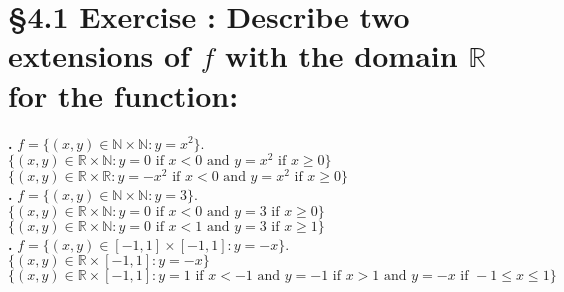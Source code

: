 \documentclass[a4paper,11pt]{article}
\begin{document}
\section*{\S 4.1 Exercise : Describe two extensions of \(f\) with the domain \(\mathbb{R}\) for the function:}
\setcounter{SubsectionCounter}{1}
\textbf{.} \(f = \{{(x,y)} \in \mathbb{N}\times \mathbb{N}:y=x^{2}\}\).\\
\(\{{(x,y)} \in \mathbb{R}\times\mathbb{N}:y=0 \text{ if } x < 0 \text{ and } y = x^2 \text{ if } x \geq 0\}\)\\
\(\{{(x,y)} \in \mathbb{R}\times\mathbb{R}:y=-x^{2} \text{ if } x < 0 \text{ and } y = x^2 \text{ if } x \geq 0\}\)\\
\setcounter{SubsectionCounter}{2}
\textbf{.} \(f = \{{(x,y)} \in \mathbb{N}\times \mathbb{N}:y=3\}\).\\
\(\{{(x,y)} \in \mathbb{R}\times\mathbb{N}:y=0 \text{ if } x < 0 \text{ and } y = 3 \text{ if } x \geq 0\}\)\\
\(\{{(x,y)} \in \mathbb{R}\times\mathbb{N}:y=0 \text{ if } x < 1 \text{ and } y = 3 \text{ if } x \geq 1\}\)\\
\setcounter{SubsectionCounter}{3}
\textbf{.} \(f = \{{(x,y)} \in {[-1,1]}\times {[-1,1]}:y=-x\}\).\\
\(\{{(x,y)} \in \mathbb{R}\times {[-1,1]}:y=-x \}\)\\
\(\{{(x,y)} \in \mathbb{R}\times {[-1,1]}:y=1 \text{ if } x < -1 \text{ and }y=-1 \text{ if } x > 1 \text{ and } y=-x \text{ if } -1 \leq x \leq 1\}\)\\
\newpage
\setcounter{ProblemCounter}{10}
\end{document}
